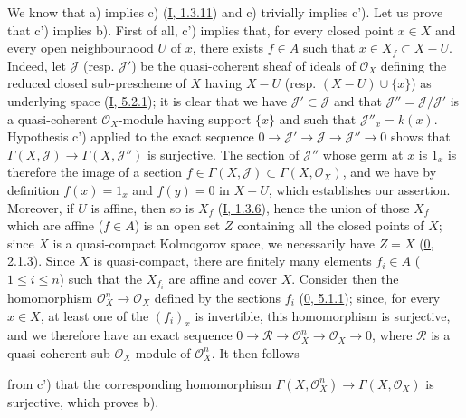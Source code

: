 We know that a) implies c) (\hyperref[I.1.3.11]{I, 1.3.11}) and c)
trivially implies c'). Let us prove that c') implies b). First of all, c')
implies that, for every closed point $x\in X$ and every open neighbourhood
$U$ of $x$, there exists $f\in A$ such that $x\in X_f\subset X-U$. Indeed, let
$\mathcal{J}$ (resp. $\mathcal{J}'$) be the quasi-coherent sheaf of ideals of
$\mathcal{O}_X$ defining the reduced closed sub-prescheme of $X$ having
$X-U$ (resp. $(X-U)\cup\{x\}$) as underlying space
(\hyperref[I.5.2.1]{I, 5.2.1}); it is clear that we have
$\mathcal{J}'\subset\mathcal{J}$ and that
$\mathcal{J}''=\mathcal{J}/\mathcal{J}'$ is a quasi-coherent
$\mathcal{O}_X$-module having support $\{x\}$ and such that
$\mathcal{J}''_x=k(x)$. Hypothesis c') applied to the exact sequence
$0\to\mathcal{J}'\to\mathcal{J}\to\mathcal{J}''\to0$ shows that
$\Gamma(X,\mathcal{J})\to\Gamma(X,\mathcal{J}'')$ is surjective. The section
of $\mathcal{J}''$ whose germ at $x$ is $1_x$ is therefore the image of a
section $f\in\Gamma(X,\mathcal{J})\subset\Gamma(X,\mathcal{O}_X)$, and we have
by definition $f(x)=1_x$ and $f(y)=0$ in $X-U$, which establishes our
assertion. Moreover, if $U$ is affine, then so is $X_f$
(\hyperref[I.1.3.6]{I, 1.3.6}), hence the union of those $X_f$ which are
affine ($f\in A$) is an open set $Z$ containing all the closed points of
$X$; since $X$ is a quasi-compact Kolmogorov space, we necessarily have
$Z=X$ (\hyperref[0.2.1.3]{0, 2.1.3}). Since $X$ is
quasi-compact, there are finitely many elements $f_i\in A$
($1\leq i\leq n$) such that the $X_{f_i}$ are affine and cover $X$.
Consider then the homomorphism $\mathcal{O}_X^n\to\mathcal{O}_X$ defined
by the sections $f_i$ (\hyperref[0.5.1.1]{0, 5.1.1}); since, for every
$x\in X$, at least one of the $(f_i)_x$ is invertible, this homomorphism is
surjective, and we therefore have an exact sequence
$0\to\mathcal{R}\to\mathcal{O}_X^n\to\mathcal{O}_X\to0$, where $\mathcal{R}$
is a quasi-coherent sub-$\mathcal{O}_X$-module of $\mathcal{O}_X^n$. It
then follows


from c') that the corresponding homomorphism
$\Gamma(X,\mathcal{O}_X^n)\to\Gamma(X,\mathcal{O}_X)$ is surjective, which
proves b).

